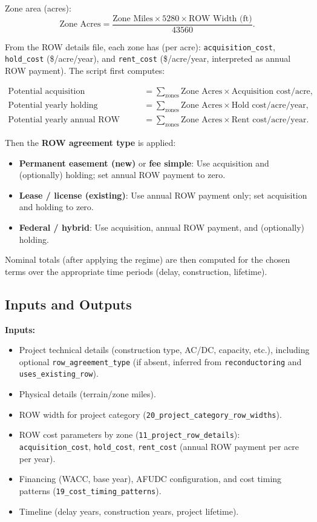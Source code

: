 \documentclass[ctcc_full_documentation.tex]{subfiles}
\begin{document}
Zone area (acres):
\begin{equation}
\text{Zone Acres} = \frac{\text{Zone Miles} \times 5280 \times \text{ROW Width (ft)}}{43560}.
\end{equation}

From the ROW details file, each zone has (per acre): \texttt{acquisition\_cost}, \texttt{hold\_cost} (\$/acre/year), and \texttt{rent\_cost} (\$/acre/year, interpreted as annual ROW payment). The script first computes:

\begin{align}
\text{Potential acquisition} &= \sum_{\text{zones}} \text{Zone Acres} \times \text{Acquisition cost/acre}, \\
\text{Potential yearly holding} &= \sum_{\text{zones}} \text{Zone Acres} \times \text{Hold cost/acre/year}, \\
\text{Potential yearly annual ROW payment} &= \sum_{\text{zones}} \text{Zone Acres} \times \text{Rent cost/acre/year}.
\end{align}

Then the \textbf{ROW agreement type} is applied:
\begin{itemize}
    \item \textbf{Permanent easement (new)} or \textbf{fee simple}: Use acquisition and (optionally) holding; set annual ROW payment to zero.
    \item \textbf{Lease / license (existing)}: Use annual ROW payment only; set acquisition and holding to zero.
    \item \textbf{Federal / hybrid}: Use acquisition, annual ROW payment, and (optionally) holding.
\end{itemize}

Nominal totals (after applying the regime) are then computed for the chosen terms over the appropriate time periods (delay, construction, lifetime).

\subsection{Inputs and Outputs}

\textbf{Inputs:}
\begin{itemize}
    \item Project technical details (construction type, AC/DC, capacity, etc.), including optional \texttt{row\_agreement\_type} (if absent, inferred from \texttt{reconductoring} and \texttt{uses\_existing\_row}).
    \item Physical details (terrain/zone miles).
    \item ROW width for project category (\texttt{20\_project\_category\_row\_widths}).
    \item ROW cost parameters by zone (\texttt{11\_project\_row\_details}): \texttt{acquisition\_cost}, \texttt{hold\_cost}, \texttt{rent\_cost} (annual ROW payment per acre per year).
    \item Financing (WACC, base year), AFUDC configuration, and cost timing patterns (\texttt{19\_cost\_timing\_patterns}).
    \item Timeline (delay years, construction years, project lifetime).
\end{itemize}
\end{document}
